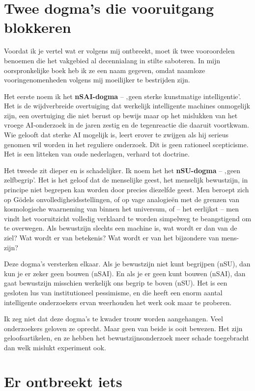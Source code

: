 \documentclass[11pt, twoside, openright]{book}
\begin{document}
\section*{Twee dogma’s die vooruitgang blokkeren}

Voordat ik je vertel wat er volgens mij ontbreekt, moet ik twee vooroordelen benoemen die het vakgebied al decennialang in stilte saboteren. In mijn oorspronkelijke boek heb ik ze een naam gegeven, omdat naamloze vooringenomenheden volgens mij moeilijker te bestrijden zijn.

Het eerste noem ik het \textbf{nSAI-dogma} -- ‚geen sterke kunstmatige intelligentie’. Het is de wijdverbreide overtuiging dat werkelijk intelligente machines onmogelijk zijn, een overtuiging die niet berust op bewijs maar op het mislukken van het vroege AI-onderzoek in de jaren zestig en de tegenreactie die daaruit voortkwam. Wie gelooft dat sterke AI mogelijk is, leert erover te zwijgen als hij serieus genomen wil worden in het reguliere onderzoek. Dit is geen rationeel scepticisme. Het is een litteken van oude nederlagen, verhard tot doctrine.

Het tweede zit dieper en is schadelijker. Ik noem het het \textbf{nSU-dogma} -- ‚geen zelfbegrip’. Het is het geloof dat de menselijke geest, het menselijk bewustzijn, in principe niet begrepen kan worden door precies diezelfde geest. Men beroept zich op Gödels onvolledigheidsstellingen, of op vage analogieën met de grenzen van kosmologische waarneming van binnen het universum, of -- het eerlijkst -- men vindt het vooruitzicht volledig verklaard te worden simpelweg te beangstigend om te overwegen. Als bewustzijn slechts een machine is, wat wordt er dan van de ziel? Wat wordt er van betekenis? Wat wordt er van het bijzondere van mens-zijn?

Deze dogma’s versterken elkaar. Als je bewustzijn niet kunt begrijpen (nSU), dan kun je er zeker geen bouwen (nSAI). En als je er geen kunt bouwen (nSAI), dan gaat bewustzijn misschien werkelijk ons begrip te boven (nSU). Het is een gesloten lus van institutioneel pessimisme, en die heeft een enorm aantal intelligente onderzoekers ervan weerhouden het werk ook maar te proberen.

Ik zeg niet dat deze dogma’s te kwader trouw worden aangehangen. Veel onderzoekers geloven ze oprecht. Maar geen van beide is ooit bewezen. Het zijn geloofsartikelen, en ze hebben het bewustzijnsonderzoek meer schade toegebracht dan welk mislukt experiment ook.

\section*{Er ontbreekt iets}
\end{document}
